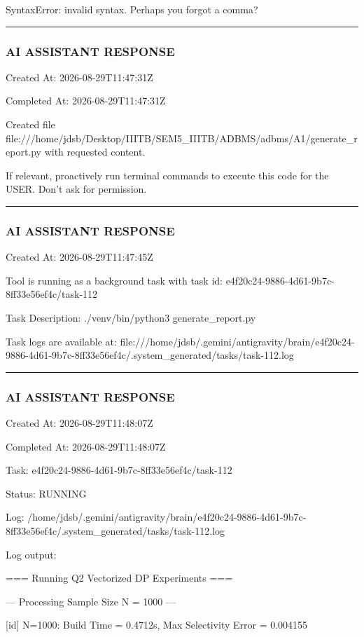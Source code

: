 \documentclass[11pt,a4paper]{article}
\begin{document}
{SyntaxError: invalid syntax. Perhaps you forgot a comma?


\hrule

\subsubsection{AI ASSISTANT RESPONSE}

Created At: 2026-08-29T11:47:31Z

Completed At: 2026-08-29T11:47:31Z

Created file file:///home/jdsb/Desktop/IIITB/SEM5\_IIITB/ADBMS/adbms/A1/generate\_report.py with requested content.

If relevant, proactively run terminal commands to execute this code for the USER. Don't ask for permission.


\hrule

\subsubsection{AI ASSISTANT RESPONSE}

Created At: 2026-08-29T11:47:45Z

Tool is running as a background task with task id: e4f20c24-9886-4d61-9b7c-8ff33e56ef4c/task-112

Task Description: ./venv/bin/python3 generate\_report.py

Task logs are available at: file:///home/jdsb/.gemini/antigravity/brain/e4f20c24-9886-4d61-9b7c-8ff33e56ef4c/.system\_generated/tasks/task-112.log


\hrule

\subsubsection{AI ASSISTANT RESPONSE}

Created At: 2026-08-29T11:48:07Z

Completed At: 2026-08-29T11:48:07Z

Task: e4f20c24-9886-4d61-9b7c-8ff33e56ef4c/task-112

Status: RUNNING

Log: /home/jdsb/.gemini/antigravity/brain/e4f20c24-9886-4d61-9b7c-8ff33e56ef4c/.system\_generated/tasks/task-112.log

Log output:

=== Running Q2 Vectorized DP Experiments ===


--- Processing Sample Size N = 1000 ---

[id] N=1000: Build Time = 0.4712s, Max Selectivity Error = 0.004155

}
\end{document}
